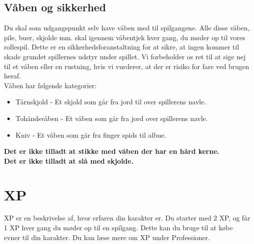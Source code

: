 \subsection*{Våben og sikkerhed}
Du skal som udgangspunkt selv have våben med til spilgangene. Alle disse våben, pile, buer, skjolde mm. skal igennem våbentjek hver gang, du møder op til vores rollespil. Dette er en sikkerhedsforanstaltning for at sikre, at ingen kommer til skade grundet spillernes udstyr under spillet. Vi forbeholder os ret til at sige nej til et våben eller en rustning, hvis vi vurderer, at der er risiko for fare ved brugen heraf.\\
Våben har følgende kategorier:
\begin{itemize}
    \item Tårnskjold - Et skjold som går fra jord til over spillerens navle.
    \item Tohåndsvåben - Et våben som går fra jord over spillerens navle.
    \item Kniv - Et våben som går fra finger spids til albue.
\end{itemize}
\textbf{Det er ikke tilladt at stikke med våben der har en hård kerne.}\\ 
\textbf{Det er ikke tilladt at slå med skjolde.}\\

\section*{XP}
XP er en beskrivelse af, hvor erfaren din karakter er. Du starter med 2 XP, og får 1 XP hver gang du møder op til en spilgang. Dette kan du bruge til at købe evner til din karakter. Du kan læse mere om XP under Professioner.

